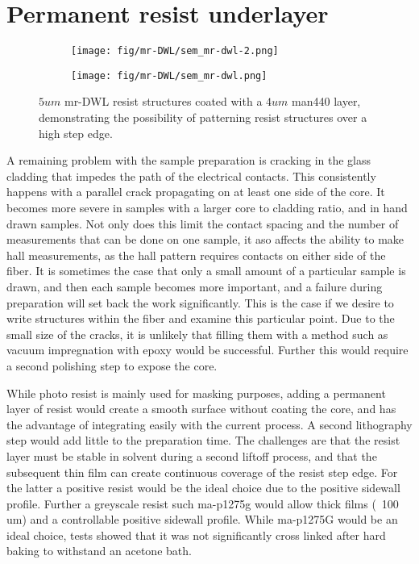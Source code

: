 
\chapter{Permanent resist underlayer}

\begin{wrapfigure}{r}{0.5\textwidth}
\centering
\begin{subfigure}{.5\textwidth}
  \centering
  \texttt{[image: fig/mr-DWL/sem\_mr-dwl-2.png]}
  \label{fig:sfig1}
\end{subfigure}%

\begin{subfigure}{.5\textwidth}
  \centering
  \texttt{[image: fig/mr-DWL/sem\_mr-dwl.png]}
  \label{fig:sfig2}
\end{subfigure}
\caption{$5um$ mr-DWL resist structures coated with a $4um$ man440 layer, demonstrating the possibility of patterning resist structures over a high step edge. }
\label{fig:fig}
\end{wrapfigure}

A remaining problem with the sample preparation is cracking in the glass cladding that impedes the path of the electrical contacts. This consistently happens with a parallel crack propagating on at least one side of the core. It becomes more severe in samples with a larger core to cladding ratio, and in hand drawn samples. Not only does this limit the contact spacing and the number of measurements that can be done on one sample, it aso affects the ability to make hall measurements, as the hall pattern requires contacts on either side of the fiber. It is sometimes the case that only a small amount of a particular sample is drawn, and then each sample becomes more important, and a failure during preparation will set back the work significantly. This is the case if we desire to write structures within the fiber and examine this particular point. Due to the small size of the cracks, it is unlikely that filling them with a method such as vacuum impregnation with epoxy would be successful. Further this would require a second polishing step to expose the core.


While photo resist is mainly used for masking purposes, adding a permanent layer of resist would create a smooth surface without coating the core, and has the advantage of integrating easily with the current process. A second lithography step would add little to the preparation time. The challenges are that the resist layer must be stable in solvent during a second liftoff process, and that the subsequent thin film can create continuous coverage of the resist step edge. For the latter a positive resist would be the ideal choice due to the positive sidewall profile. Further a greyscale resist such ma-p1275g  would allow thick films (~100 um) and a controllable positive sidewall profile. While ma-p1275G would be an ideal choice, tests showed that it was not significantly cross linked after hard baking to withstand an acetone bath. 

